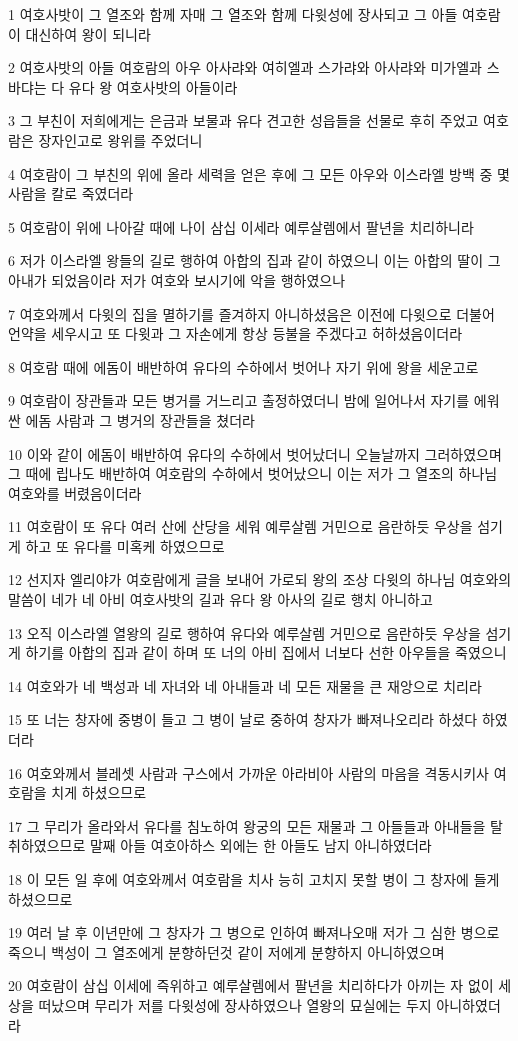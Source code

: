 \par 1 여호사밧이 그 열조와 함께 자매 그 열조와 함께 다윗성에 장사되고 그 아들 여호람이 대신하여 왕이 되니라
\par 2 여호사밧의 아들 여호람의 아우 아사랴와 여히엘과 스가랴와 아사랴와 미가엘과 스바댜는 다 유다 왕 여호사밧의 아들이라
\par 3 그 부친이 저희에게는 은금과 보물과 유다 견고한 성읍들을 선물로 후히 주었고 여호람은 장자인고로 왕위를 주었더니
\par 4 여호람이 그 부친의 위에 올라 세력을 얻은 후에 그 모든 아우와 이스라엘 방백 중 몇 사람을 칼로 죽였더라
\par 5 여호람이 위에 나아갈 때에 나이 삼십 이세라 예루살렘에서 팔년을 치리하니라
\par 6 저가 이스라엘 왕들의 길로 행하여 아합의 집과 같이 하였으니 이는 아합의 딸이 그 아내가 되었음이라 저가 여호와 보시기에 악을 행하였으나
\par 7 여호와께서 다윗의 집을 멸하기를 즐겨하지 아니하셨음은 이전에 다윗으로 더불어 언약을 세우시고 또 다윗과 그 자손에게 항상 등불을 주겠다고 허하셨음이더라
\par 8 여호람 때에 에돔이 배반하여 유다의 수하에서 벗어나 자기 위에 왕을 세운고로
\par 9 여호람이 장관들과 모든 병거를 거느리고 출정하였더니 밤에 일어나서 자기를 에워싼 에돔 사람과 그 병거의 장관들을 쳤더라
\par 10 이와 같이 에돔이 배반하여 유다의 수하에서 벗어났더니 오늘날까지 그러하였으며 그 때에 립나도 배반하여 여호람의 수하에서 벗어났으니 이는 저가 그 열조의 하나님 여호와를 버렸음이더라
\par 11 여호람이 또 유다 여러 산에 산당을 세워 예루살렘 거민으로 음란하듯 우상을 섬기게 하고 또 유다를 미혹케 하였으므로
\par 12 선지자 엘리야가 여호람에게 글을 보내어 가로되 왕의 조상 다윗의 하나님 여호와의 말씀이 네가 네 아비 여호사밧의 길과 유다 왕 아사의 길로 행치 아니하고
\par 13 오직 이스라엘 열왕의 길로 행하여 유다와 예루살렘 거민으로 음란하듯 우상을 섬기게 하기를 아합의 집과 같이 하며 또 너의 아비 집에서 너보다 선한 아우들을 죽였으니
\par 14 여호와가 네 백성과 네 자녀와 네 아내들과 네 모든 재물을 큰 재앙으로 치리라
\par 15 또 너는 창자에 중병이 들고 그 병이 날로 중하여 창자가 빠져나오리라 하셨다 하였더라
\par 16 여호와께서 블레셋 사람과 구스에서 가까운 아라비아 사람의 마음을 격동시키사 여호람을 치게 하셨으므로
\par 17 그 무리가 올라와서 유다를 침노하여 왕궁의 모든 재물과 그 아들들과 아내들을 탈취하였으므로 말째 아들 여호아하스 외에는 한 아들도 남지 아니하였더라
\par 18 이 모든 일 후에 여호와께서 여호람을 치사 능히 고치지 못할 병이 그 창자에 들게 하셨으므로
\par 19 여러 날 후 이년만에 그 창자가 그 병으로 인하여 빠져나오매 저가 그 심한 병으로 죽으니 백성이 그 열조에게 분향하던것 같이 저에게 분향하지 아니하였으며
\par 20 여호람이 삼십 이세에 즉위하고 예루살렘에서 팔년을 치리하다가 아끼는 자 없이 세상을 떠났으며 무리가 저를 다윗성에 장사하였으나 열왕의 묘실에는 두지 아니하였더라

